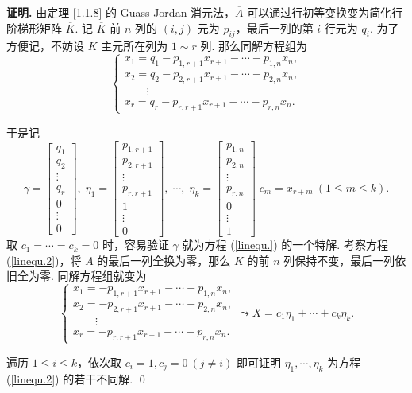 \documentclass[10pt,openany]{article}
\theoremstyle{thmstyle} %
\theoremstyle{defstyle} %
\theoremstyle{prostyle} %
\theoremstyle{exastyle}
\theoremstyle{remstyle}
\renewenvironment{proof}[1][证明]{\par\underline{\textbf{#1.}} \;\fangsong}{\qed\par}
\begin{document}
\begin{proof}
	由定理 \ref{1.1.8} 的 Guass-Jordan 消元法，\( \overline{A} \) 可以通过行初等变换变为简化行阶梯形矩阵 \( \overline{K} \). 记 \( \overline{K} \) 前 \( n \) 列的 \( (i,j) \) 元为 \( p_{ij} \)，最后一列的第 \( i \) 行元为 \( q_i \). 为了方便记，不妨设 \( \overline{K} \) 主元所在列为 \( 1 \sim r \) 列. 那么同解方程组为
	\[ \left\{ \begin{array}{l}
		x_1= q_1-p_{1,r+1}x_{r+1}-\cdots-p_{1,n}x_n, \\
		x_2= q_2-p_{2,r+1}x_{r+1}-\cdots-p_{2,n}x_n, \\
		\qquad \vdots \\
		x_r= q_r-p_{r,r+1}x_{r+1}-\cdots-p_{r,n}x_n. 
	\end{array}\right. \]
	
	于是记
	\[ \gamma=\begin{bmatrix}
		q_1 \\ q_2 \\ \vdots \\ q_r \\ 0  \\ \vdots \\ 0
	\end{bmatrix},\; \eta_1=\begin{bmatrix}
	p_{1,r+1} \\ p_{2,r+1} \\ \vdots \\ p_{r,r+1} \\ 1 \\ \vdots \\ 0
	\end{bmatrix}, \; \cdots, \; \eta_k=\begin{bmatrix}
	p_{1,n} \\ p_{2,n} \\ \vdots \\ p_{r,n} \\ 0 \\ \vdots \\ 1
	\end{bmatrix}  \; c_{m}=x_{r+m} \ ( 1 \leq m \leq k). \]
	取 \( c_1=\cdots=c_k=0 \) 时，容易验证 \( \gamma \) 就为方程 (\ref{linequ.}) 的一个特解. 考察方程 (\ref{linequ.2})，将 \( \overline{A} \) 的最后一列全换为零，那么 \( \overline{K} \) 的前 \( n \) 列保持不变，最后一列依旧全为零. 同解方程组就变为
	\[ \left\{ \begin{array}{l}
		x_1= -p_{1,r+1}x_{r+1}-\cdots-p_{1,n}x_n, \\
		x_2= -p_{2,r+1}x_{r+1}-\cdots-p_{2,n}x_n, \\
		\qquad \vdots \\
		x_r= -p_{r,r+1}x_{r+1}-\cdots-p_{r,n}x_n. 
	\end{array}\right. \leadsto X=c_1\eta_1+\cdots+c_k\eta_k. \]
	
    遍历 \( 1 \leq i \leq k \)，依次取 \( c_i=1, c_j=0 \ (j \neq i) \) 即可证明 \( \eta_1,\cdots,\eta_k \) 为方程 (\ref{linequ.2}) 的若干不同解.
\end{proof}
\end{document}
